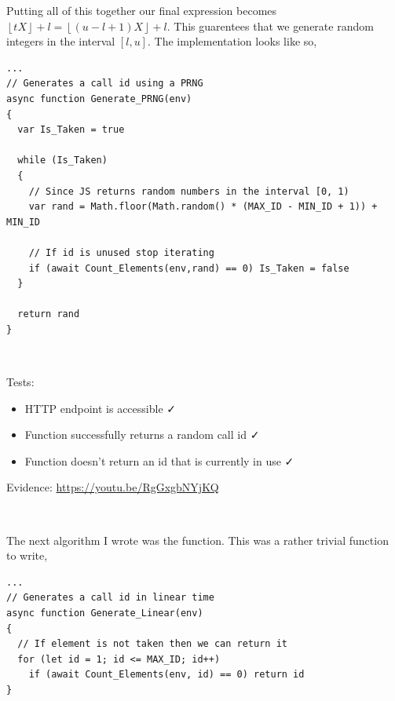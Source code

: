 Putting all of this together our final expression becomes 
$\left \lfloor tX \right \rfloor +l = \left \lfloor (u - l + 1)X \right \rfloor + l$.
This guarentees that we generate random integers
in the interval $[l, u]$. The implementation looks like so,

\begin{verbatim}
...
// Generates a call id using a PRNG
async function Generate_PRNG(env)
{
  var Is_Taken = true

  while (Is_Taken)
  {
    // Since JS returns random numbers in the interval [0, 1)
    var rand = Math.floor(Math.random() * (MAX_ID - MIN_ID + 1)) + MIN_ID

    // If id is unused stop iterating
    if (await Count_Elements(env,rand) == 0) Is_Taken = false
  }

  return rand
}
\end{verbatim}

{\color{gray} \hrulefill} \\ \vspace{0.2cm}

{\sffamily Tests:}

\begin{itemize}
  \item HTTP endpoint is accessible \faCheck \\
  \item Function successfully returns a random call id \faCheck \\
  \item Function doesn't return an id that is currently in use \faCheck \\
\end{itemize}

{\sffamily Evidence:} \url{https://youtu.be/RgGxgbNYjKQ}\\ \vspace{0.2cm}

{\color{gray} \hrulefill} \\ \vspace{0.2cm}

The next algorithm I wrote was the 
function. This was a rather trivial function to write, 

\begin{verbatim}
...
// Generates a call id in linear time
async function Generate_Linear(env)
{
  // If element is not taken then we can return it
  for (let id = 1; id <= MAX_ID; id++)
    if (await Count_Elements(env, id) == 0) return id
}
\end{verbatim}

